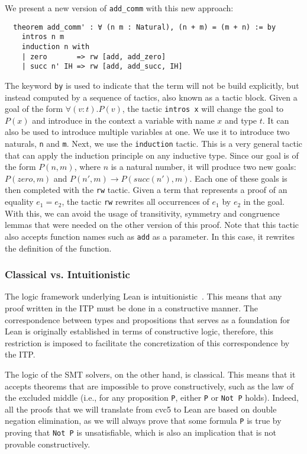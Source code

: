 We present a new version of \texttt{add\_comm} with this new approach:

\begin{verbatim}
  theorem add_comm' : ∀ (n m : Natural), (n + m) = (m + n) := by
    intros n m
    induction n with
    | zero       => rw [add, add_zero]
    | succ n' IH => rw [add, add_succ, IH]
\end{verbatim}

The keyword \texttt{by} is used to indicate that the term will not be build explicitly, but instead computed by a sequence of tactics, also known as a tactic block. Given a goal of the form $\forall (v : t) . P(v)$, the tactic \texttt{intros x} will change the goal to $P(x)$ and introduce in the context a variable with name $x$ and type $t$. It can also be used to introduce multiple variables at one. We use it to introduce two naturals, \texttt{n} and \texttt{m}. Next, we use the \texttt{induction} tactic. This is a very general tactic that can apply the induction principle on any inductive type. Since our goal is of the form $P(n, m)$, where $n$ is a natural number, it will produce two new goals: $P(zero, m)$ and $P(n', m) \rightarrow P(succ(n'), m)$. Each one of these goals is then completed with the \texttt{rw} tactic. Given a term that represents a proof of an equality $e_{1} = e_{2}$, the tactic \texttt{rw} rewrites all occurrences of $e_{1}$ by $e_{2}$ in the goal. With this, we can avoid the usage of transitivity, symmetry and congruence lemmas that were needed on the other version of this proof. Note that this tactic also accepts function names such as \texttt{add} as a parameter. In this case, it rewrites the definition of the function.

\subsubsection{Classical vs. Intuitionistic}

The logic framework underlying Lean is intuitionistic~\cite{intuitionistic}. This means that any proof written in the ITP
must be done in a constructive manner. The correspondence between types and propositions that serves as a foundation for Lean
is originally established in terms of constructive logic, therefore, this restriction is imposed to facilitate the concretization
of this correspondence by the ITP.\

The logic of the SMT solvers, on the other hand, is classical. This means that it accepts theorems that are impossible to prove
constructively, such as the law of the excluded middle (i.e., for any proposition \texttt{P}, either \texttt{P} or \texttt{Not P}
holds). Indeed, all the proofs that we will translate from cvc5 to Lean are based on double negation elimination, as we will
always prove that some formula \texttt{P} is true by proving that \texttt{Not P} is unsatisfiable, which is also an implication
that is not provable constructively.

